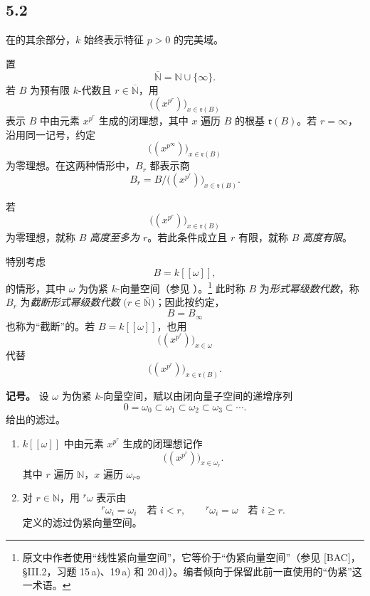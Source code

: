 
\subsection*{5.2}
\label{sga3:VIIB:5.2}

在的其余部分，\(k\) 始终表示特征 \(p>0\) 的完美域。

置
\[
  \overline{\mathbb N}=\mathbb N\cup\{\infty\}.
\]
若 \(B\) 为预有限 \(k\)-代数且 \(r\in\overline{\mathbb N}\)，用
\[
  \bigl((x^{p^r})\bigr)_{x\in\mathfrak r(B)}
\]
表示 \(B\) 中由元素 \(x^{p^r}\) 生成的闭理想，其中 \(x\) 遍历 \(B\) 的根基 \(\mathfrak r(B)\)。若 \(r=\infty\)，沿用同一记号，约定
\[
  \bigl((x^{p^\infty})\bigr)_{x\in\mathfrak r(B)}
\]
为零理想。在这两种情形中，\(B_r\) 都表示商
\[
  B_r
  =
  B\big/\bigl((x^{p^r})\bigr)_{x\in\mathfrak r(B)}.
\]

若
\[
  \bigl((x^{p^r})\bigr)_{x\in\mathfrak r(B)}
\]
为零理想，就称 \(B\) \emph{高度至多为 \(r\)}。若此条件成立且 \(r\) 有限，就称 \(B\) \emph{高度有限}。

特别考虑
\[
  B=k[[\omega]],
\]
的情形，其中 \(\omega\) 为伪紧 \(k\)-向量空间\textup{（参见 ）}。\footnote{%
\label{sga3:VIIB:nde:153}原文中作者使用“线性紧向量空间”，它等价于“伪紧向量空间”\textup{（参见 [BAC]，\S III.2，习题 15\,a)、19\,a) 和 20\,d)）}。编者倾向于保留此前一直使用的“伪紧”这一术语。}
此时称 \(B\) 为\emph{形式幂级数代数}，称 \(B_r\) 为\emph{截断形式幂级数代数} \(\bigl(r\in\overline{\mathbb N}\bigr)\)；因此按约定，
\[
  B=B_\infty
\]
也称为“截断”的。若 \(B=k[[\omega]]\)，也用
\[
  \bigl((x^{p^r})\bigr)_{x\in\omega}
\]
代替
\[
  \bigl((x^{p^r})\bigr)_{x\in\mathfrak r(B)}.
\]

\medskip
\noindent\textbf{记号。}
设 \(\omega\) 为伪紧 \(k\)-向量空间，赋以由闭向量子空间的递增序列
\[
  0=\omega_0\subset\omega_1\subset\omega_2
  \subset\omega_3\subset\cdots.
\]
给出的滤过。
\begin{enumerate}
\item[\textup{\SGAInlineRefTarget{sga3:VIIB:5.2:item:a}(a)}]
\(k[[\omega]]\) 中由元素 \(x^{p^r}\) 生成的闭理想记作
\[
  \bigl((x^{p^r})\bigr)_{x\in\omega_r}.
\]
其中 \(r\) 遍历 \(\mathbb N\)，\(x\) 遍历 \(\omega_r\)。

\item[\textup{(b)}]
对 \(r\in\mathbb N\)，用 \({}^r\omega\) 表示由
\[
  {}^r\omega_i=\omega_i\quad\text{若 }i<r,
  \qquad
  {}^r\omega_i=\omega\quad\text{若 }i\geq r.
\]
定义的滤过伪紧向量空间。
\end{enumerate}

